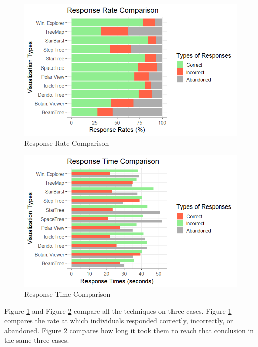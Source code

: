 \documentclass[twocolumn]{article}
\begin{document}
		\begin{figure}[H]
			\includegraphics[scale=0.57]{response_rate_comparison.png}
			\caption{Response Rate Comparison}
			\label{Response Rate Comparison}
		\end{figure}
		\begin{figure}[H]
			\includegraphics[scale=0.57]{response_time_comparison.png}
			\caption{Response Time Comparison}
			\label{Response Time Comparison}
		\end{figure}
	
		Figure \ref{Response Rate Comparison} and Figure \ref{Response Time Comparison} compare all the techniques on three cases. Figure \ref{Response Rate Comparison} compares the rate at which	individuals responded correctly, incorrectly, or abandoned. Figure \ref{Response Time Comparison} compares how long it took them to reach that conclusion in the same three cases.
\\
		
\end{document}
